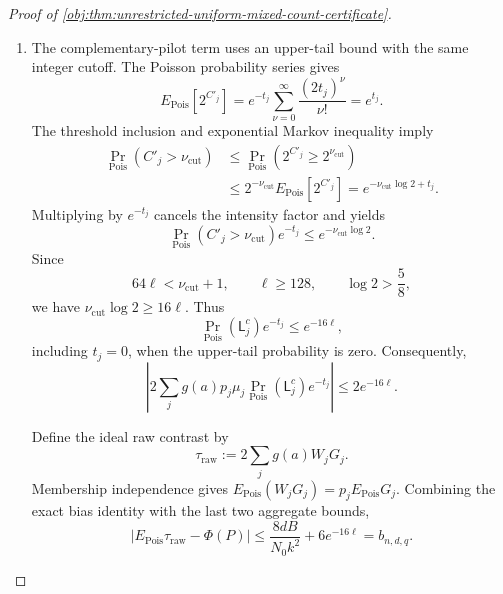 \begin{proof}[Proof of \cref{obj:thm:unrestricted-uniform-mixed-count-certificate}]
\begin{enumerate}
For \(t_j>B\), Cauchy--Schwarz and the heavy moment estimate give
\[
\begin{aligned}
\left\{
\Pr_{\mathrm{Pois}}(\mathsf L_j)
|E_{\mathrm{Pois}}H_j|
\right\}^2
&\le
\Pr_{\mathrm{Pois}}(\mathsf L_j)
E_{\mathrm{Pois}}H_j^2\\
&\le e^{-t_j/8}.
\end{aligned}
\]
Using
\(\mu_jQ_k(t_j)=\mu_j-E_{\mathrm{Pois}}H_j\), it follows that
\[
\begin{aligned}
\mu_j\Pr_{\mathrm{Pois}}(\mathsf L_j)|Q_k(t_j)|
&\le
\Pr_{\mathrm{Pois}}(\mathsf L_j)
+\Pr_{\mathrm{Pois}}(\mathsf L_j)|E_{\mathrm{Pois}}H_j|\\
&\le2e^{-t_j/16}\le2e^{-16\ell}.
\end{aligned}
\]
Splitting the cell sum at \(t_j=B\), using \(|g(a)|=1\) from
\cref{obj:synth_19}, and then using \(4d\) cells and \(\sum_jp_j=1\), yields
\[
\left|
2\sum_jg(a)p_j\mu_j
\Pr_{\mathrm{Pois}}(\mathsf L_j)Q_k(t_j)
\right|
\le\frac{8dB}{N_0k^2}+4e^{-16\ell}.
\]

\item The complementary-pilot term uses an upper-tail bound with the same
integer cutoff. The Poisson probability series gives
\[
E_{\mathrm{Pois}}[2^{C'_j}]
=e^{-t_j}\sum_{\nu=0}^{\infty}\frac{(2t_j)^\nu}{\nu!}
=e^{t_j}.
\]
The threshold inclusion and exponential Markov inequality imply
\[
\begin{aligned}
\Pr_{\mathrm{Pois}}(C'_j>\nu_{\mathrm{cut}})
&\le\Pr_{\mathrm{Pois}}(2^{C'_j}\ge2^{\nu_{\mathrm{cut}}})\\
&\le2^{-\nu_{\mathrm{cut}}}E_{\mathrm{Pois}}[2^{C'_j}]
=e^{-\nu_{\mathrm{cut}}\log2+t_j}.
\end{aligned}
\]
Multiplying by \(e^{-t_j}\) cancels the intensity factor and yields
\[
\Pr_{\mathrm{Pois}}(C'_j>\nu_{\mathrm{cut}})e^{-t_j}
\le e^{-\nu_{\mathrm{cut}}\log2}.
\]
Since
\[
64\ell<\nu_{\mathrm{cut}}+1,\qquad
\ell\ge128,\qquad \log2>\frac58,
\]
we have \(\nu_{\mathrm{cut}}\log2\ge16\ell\). Thus
\[
\Pr_{\mathrm{Pois}}(\mathsf L_j^c)e^{-t_j}\le e^{-16\ell},
\]
including \(t_j=0\), when the upper-tail probability is zero.
Consequently,
\[
\left|
2\sum_jg(a)p_j\mu_j
\Pr_{\mathrm{Pois}}(\mathsf L_j^c)e^{-t_j}
\right|
\le2e^{-16\ell}.
\]

Define the ideal raw contrast by
\[
\tau_{\mathrm{raw}}
:=2\sum_jg(a)W_jG_j.
\]
Membership independence gives
\(E_{\mathrm{Pois}}(W_jG_j)=p_jE_{\mathrm{Pois}}G_j\).
Combining the exact bias identity with the last two aggregate bounds,
\[
|E_{\mathrm{Pois}}\tau_{\mathrm{raw}}-\Phi(P)|
\le
\frac{8dB}{N_0k^2}+6e^{-16\ell}
=b_{n,d,q}.
\]


\end{enumerate}
\end{proof}
